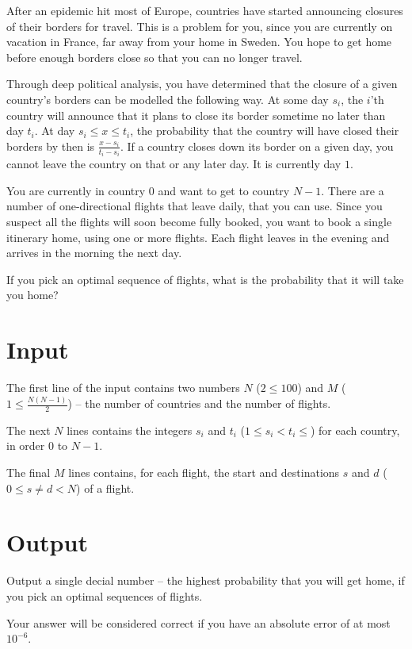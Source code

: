 After an epidemic hit most of Europe, countries have started announcing closures of their borders for travel.
This is a problem for you, since you are currently on vacation in France, far away from your home in Sweden.
You hope to get home before enough borders close so that you can no longer travel.

Through deep political analysis, you have determined that the closure of a given country's borders can be modelled the following way.
At some day $s_i$, the $i$'th country will announce that it plans to close its border sometime no later than day $t_i$.
At day $s_i \le x \le t_i$, the probability that the country will have closed their borders by then is $\frac{x - s_i}{t_i - s_i}$.
If a country closes down its border on a given day, you cannot leave the country on that or any later day.
It is currently day $1$.

You are currently in country $0$ and want to get to country $N - 1$.
There are a number of one-directional flights that leave daily, that you can use.
Since you suspect all the flights will soon become fully booked, you want to book a single itinerary home, using one or more flights.
Each flight leaves in the evening and arrives in the morning the next day.

If you pick an optimal sequence of flights, what is the probability that it will take you home?

\section*{Input}
The first line of the input contains two numbers $N$ ($2 \le 100$) and $M$ ($1 \le \frac{N(N-1)}{2}$)  -- the number of countries and the number of flights.

The next $N$ lines contains the integers $s_i$ and $t_i$ ($1 \le s_i < t_i \le $) for each country, in order $0$ to $N - 1$.

The final $M$ lines contains, for each flight, the start and destinations $s$ and $d$ ($0 \le s \neq d < N$) of a flight.

\section{Output}
Output a single decial number -- the highest probability that you will get home, if you pick an optimal sequences of flights.

Your answer will be considered correct if you have an absolute error of at most ${10}^{-6}$.
